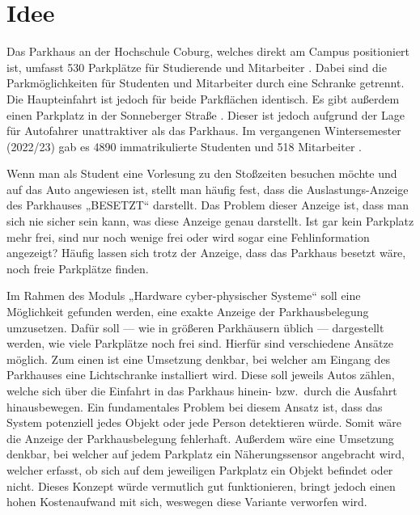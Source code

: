 \section{Idee}\label{ch:Einleitung}
Das Parkhaus an der Hochschule Coburg, welches direkt am Campus positioniert ist, umfasst 530 Parkplätze für Studierende und Mitarbeiter \cite{parkhaus}.
Dabei sind die Parkmöglichkeiten für Studenten und Mitarbeiter durch eine Schranke getrennt.
Die Haupteinfahrt ist jedoch für beide Parkflächen identisch.
Es gibt außerdem einen Parkplatz in der Sonneberger Straße \cite{anfahrt}.
Dieser ist jedoch aufgrund der Lage für Autofahrer unattraktiver als das Parkhaus.
Im vergangenen Wintersemester (2022/23) gab es 4890 immatrikulierte Studenten und 518 Mitarbeiter \cite{HSCoburgZahlen}.

Wenn man als Student eine Vorlesung zu den Stoßzeiten besuchen möchte und auf das Auto angewiesen ist, stellt man häufig fest, dass die Auslastungs-Anzeige des Parkhauses „BESETZT“ darstellt.
Das Problem dieser Anzeige ist, dass man sich nie sicher sein kann, was diese Anzeige genau darstellt.
Ist gar kein Parkplatz mehr frei, sind nur noch wenige frei oder wird sogar eine Fehlinformation angezeigt?
Häufig lassen sich trotz der Anzeige, dass das Parkhaus besetzt wäre, noch freie Parkplätze finden.

Im Rahmen des Moduls „Hardware cyber-physischer Systeme“ soll eine Möglichkeit gefunden werden, eine exakte Anzeige der Parkhausbelegung umzusetzen.
Dafür soll --- wie in größeren Parkhäusern üblich --- dargestellt werden, wie viele Parkplätze noch frei sind.
Hierfür sind verschiedene Ansätze möglich.
Zum einen ist eine Umsetzung denkbar, bei welcher am Eingang des Parkhauses eine Lichtschranke installiert wird.
Diese soll jeweils Autos zählen, welche sich über die Einfahrt in das Parkhaus hinein- bzw.\ durch die Ausfahrt hinausbewegen.
Ein fundamentales Problem bei diesem Ansatz ist, dass das System potenziell jedes Objekt oder jede Person detektieren würde.
Somit wäre die Anzeige der Parkhausbelegung fehlerhaft.
Außerdem wäre eine Umsetzung denkbar, bei welcher auf jedem Parkplatz ein Näherungssensor angebracht wird, welcher erfasst, ob sich auf dem jeweiligen Parkplatz ein Objekt befindet oder nicht.
Dieses Konzept würde vermutlich gut funktionieren, bringt jedoch einen hohen Kostenaufwand mit sich, weswegen diese Variante verworfen wird.

